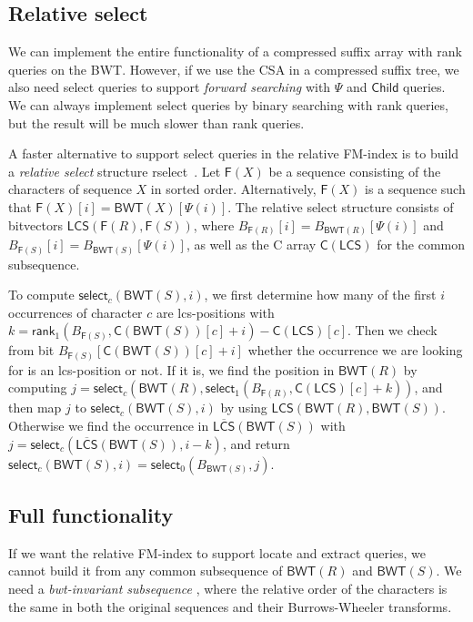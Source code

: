 \documentclass[a4paper,11pt]{llncs}
\renewcommand{\complement}[1]{\ensuremath{\overline{ #1 }}}
\newcommand{\BWT}{\textsf{BWT}}
\newcommand{\CSA}{\textsf{CSA}}
\newcommand{\mBWT}{\ensuremath{\mathsf{BWT}}}
\newcommand{\mF}{\ensuremath{\mathsf{F}}}
\newcommand{\C}{\textsf{C}}
\newcommand{\mC}{\ensuremath{\mathsf{C}}}
\newcommand{\mLCS}{\ensuremath{\mathsf{LCS}}}
\newcommand{\mCS}{\ensuremath{\complement{\mathsf{LCS}}}}
\newcommand{\rselect}{\textsf{rselect}}
\newcommand{\locate}{\textsf{locate}}
\newcommand{\extract}{\textsf{extract}}
\newcommand{\rank}{\textsf{rank}}
\newcommand{\select}{\textsf{select}}
\newcommand{\mPsi}{\ensuremath{\mathsf{\Psi}}}
\newcommand{\mrank}{\ensuremath{\mathsf{rank}}}
\newcommand{\mselect}{\ensuremath{\mathsf{select}}}
\newcommand{\mChild}{\ensuremath{\mathsf{Child}}}
\begin{document}
\subsection{Relative select}

We can implement the entire functionality of a compressed suffix array with
\rank{} queries on the \BWT. However, if we use the \CSA{} in a compressed
suffix tree, we also need \select{} queries to support \emph{forward
searching} with $\mPsi$ and $\mChild$ queries. We can always implement
\select{} queries by binary searching with \rank{} queries, but the result
will be much slower than \rank{} queries.

A faster alternative to support \select{} queries in the relative FM-index
is to build a \emph{relative select} structure \rselect{}~\cite{Boucher2015}.
Let $\mF(X)$ be a sequence consisting of the characters of sequence $X$ in
sorted order. Alternatively, $\mF(X)$ is a sequence such that $\mF(X)[i] =
\mBWT(X)[\mPsi(i)]$. The relative select structure consists of bitvectors
$\mLCS(\mF(R), \mF(S))$, where $B_{\mF(R)}[i] = B_{\mBWT(R)}[\mPsi(i)]$ and
$B_{\mF(S)}[i] = B_{\mBWT(S)}[\mPsi(i)]$, as well as the \C{} array
$\mC(\mLCS)$ for the common subsequence.

To compute $\mselect_{c}(\mBWT(S), i)$, we first determine how many of
the first $i$ occurrences of character $c$ are lcs-positions with $k =
\mrank_{1}(B_{\mF(S)}, \mC(\mBWT(S))[c] + i) - \mC(\mLCS)[c]$. Then we check
from bit $B_{\mF(S)}[\mC(\mBWT(S))[c] + i]$ whether the occurrence we are
looking for is an lcs-position or not. If it is,
we find the position in $\mBWT(R)$ by computing $j = \mselect_{c}(\mBWT(R),
\mselect_{1}(B_{\mF(R)}, \mC(\mLCS)[c] + k))$, and then map $j$ to
$\mselect_{c}(\mBWT(S), i)$ by using $\mLCS(\mBWT(R), \mBWT(S))$. Otherwise we
find the occurrence in $\mCS(\mBWT(S))$ with $j = \mselect_{c}(\mCS(\mBWT(S)),
i-k)$, and return $\mselect_{c}(\mBWT(S), i) = \mselect_{0}(B_{\mBWT(S)}, j)$.

\subsection{Full functionality}

If we want the relative FM-index to support \locate{} and \extract{} queries,
we cannot build it from any common subsequence of $\mBWT(R)$ and $\mBWT(S)$.
We need a \emph{bwt-invariant subsequence} \cite{Belazzougui2014}, where the
relative order of the characters is the same in both the original sequences
and their Burrows-Wheeler transforms.
\end{document}
